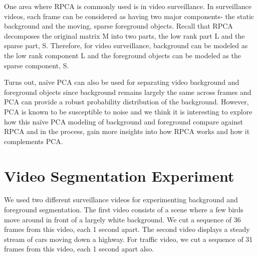 \documentclass[11pt]{scrartcl} %
\theoremstyle{plain}
\begin{document}
One area where RPCA is commonly used is in video surveillance. In surveillance videos, each frame can be considered as having two major components- the static background and the moving, sparse foreground objects. Recall that RPCA decomposes the original matrix M into two parts, the low rank part L and the sparse part, S. Therefore, for video surveillance, background can be modeled as the low rank component L and the foreground objects can be modeled as the sparse component, S.

Turns out, naïve PCA can also be used for separating video background and foreground objects since background remains largely the same across frames and PCA can provide a robust probability distribution of the background. However, PCA is known to be susceptible to noise and we think it is interesting to explore how this naïve PCA modeling of background and foreground compare against RPCA and in the process, gain more insights into how RPCA works and how it complements PCA.

\section{Video Segmentation Experiment}

We used two different surveillance videos for experimenting background and foreground segmentation. The first video consists of a scene where a few birds move around in front of a largely white background. We cut a sequence of 36 frames from this video, each 1 second apart. The second video  displays a steady stream of cars moving down a highway. For traffic video, we cut a sequence of 31 frames from this video, each 1 second apart also. 
\end{document}
